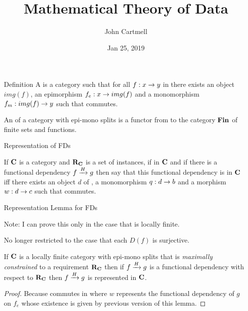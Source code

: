\documentclass[xcolor=pst,dvips]{beamer}   %
\title[John Cartmell]{Mathematical Theory of Data}
\author{John Cartmell}
\institute{ad otium}
\date{Jan 25, 2019}
\begin{document}
\begin{frame}
\titlepage
\end{frame}

\section{\MToDsection}
\subsection{\MToDsubsectionCategorieswithEpiMonos}
\begin{frame}{Definition}
A  is a category such that for all $f:x \morph y$
in \catcw there exists an object $img(f)$, an epimorphism $f_e:x \morph img(f)$
and a monomorphism $f_m:img(f) \morph y$ such that
commutes. 

An  of a category with epi-mono splits \catcw is a functor from 
\catcw to the category $\Fin$ of finite sets and functions.
\end{frame}

\begin{frame}{Representation of FDs}
\begin{definition}
If $\catc$ is a category and $\reqtc$ is a set of instances, 
if \fgsourcediagram in $\catc$ 
and if there is a functional dependency $\fundep{H}{f}{g}$ then say that 
this functional dependency  is  in $\catc$ 
iff there exists an object $d$ of \catc, a monomorphism $q:d \morph b$ and a morphism $w: d \morph c$
such that  commutes.
\end{definition}
\end{frame}

\begin{frame}{Representation Lemma for FDs}
{\small Note: I can prove this only in the case that \catcw is locally finite.

No longer restricted to the case that each $D(f)$ is surjective.}

\begin{lemma}
If $\catc$ is a locally finite category with epi-mono splits that is 
\textit{maximally constrained} to a requirement $\reqtc$ then
if $\fundep{H}{f}{g}$  is a functional dependency with respect to $\reqtc$
then $\fundep{H}{f}{g}$ is represented in $\catc$.
\end{lemma}
\begin{proof}
Because 
 commutes in \catcw  where $w$ represents 
the functional dependency of $g$ on $f_e$ whose existence is given by previous version of this lemma.
\end{proof}
\end{frame}
\end{document}

